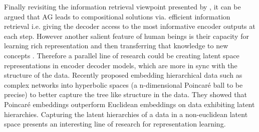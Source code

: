 Finally revisiting the information retrieval viewpoint presented by \cite{Vaswani2017}, it can be argued that AG leads to compositional solutions via. efficient information retrieval  i.e. giving the decoder access to the most informative encoder outputs at each step. However another salient feature of human beings is their capacity for learning rich representation and then transferring that knowledge to new concepts \citep{Lake2015}. Therefore a parallel line of research could be creating latent space representations in encoder decoder models,  which are more in sync with the structure of the data. Recently \cite{Nickel2017} proposed embedding hierarchical data such as complex networks into hyperbolic spaces (a n-dimensional Poincar\'e ball to be precise) to better capture the tree like structure in the data. They showed that Poincar\'e embeddings outperform Euclidean embeddings on data exhibiting latent hierarchies. Capturing the latent hierarchies of a data in a non-euclidean latent space presents an interesting line of research for representation learning.
